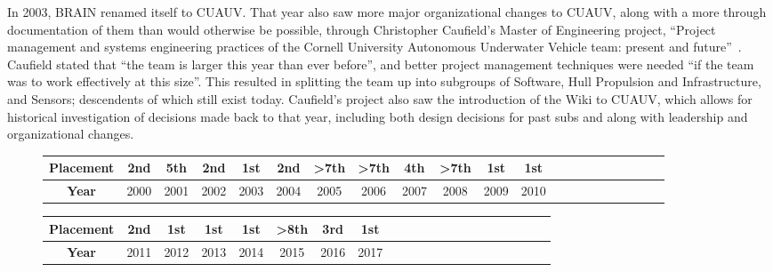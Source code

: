 \documentclass[12pt]{article}
\begin{document}
In 2003, BRAIN renamed itself to CUAUV.
That year also saw more major organizational changes to CUAUV, along with a more through documentation of them than would otherwise be possible, through Christopher Caufield's Master of Engineering project, ``Project management and systems engineering practices of the Cornell University Autonomous Underwater Vehicle team: present and future''~\cite{caufield_project_2004}.
Caufield stated that ``the team is larger this year than ever before'', and better project management techniques were needed ``if the team was to work effectively at this size''.
This resulted in splitting the team up into subgroups of Software, Hull Propulsion and Infrastructure, and Sensors; descendents of which still exist today.
Caufield's project also saw the introduction of the Wiki to CUAUV, which allows for historical investigation of decisions made back to that year, including both design decisions for past subs and along with leadership and organizational changes.

\begin{figure}
  \centering

  \begin{tabular}{|c||c|c|c|c|c|c|c|c|c|c|c|c|c|c|c|c|c|c|c|c|}
    \hline
    \textbf{Placement} & \cellcolor{gray!50}2nd & 5th & \cellcolor{gray!50}2nd & \cellcolor{Goldenrod}1st & \cellcolor{gray!50}2nd & \textgreater 7th & \textgreater 7th & 4th & \textgreater 7th & \cellcolor{Goldenrod}1st & \cellcolor{Goldenrod}1st \\
    \hline
    \textbf{Year} & 2000 & 2001 & 2002 & 2003 & 2004 & 2005 & 2006 & 2007 & 2008 & 2009 & 2010\\
    \hline
  \end{tabular}
  \vspace{0.3cm}

  \begin{tabular}{|c||c|c|c|c|c|c|c|c|c|c|c|c|c|c|c|c|c|c|c|c|}
    \hline
    \textbf{Placement} & \cellcolor{gray!50}2nd & \cellcolor{Goldenrod}1st & \cellcolor{Goldenrod}1st & \cellcolor{Goldenrod}1st & \textgreater 8th & \cellcolor{RawSienna!75}3rd & \cellcolor{Goldenrod}1st\\
    \hline
    \textbf{Year} & 2011 & 2012 & 2013 & 2014 & 2015 & 2016 & 2017\\
    \hline
  \end{tabular}
  \label{table:cuauv}
\end{figure}
\end{document}
